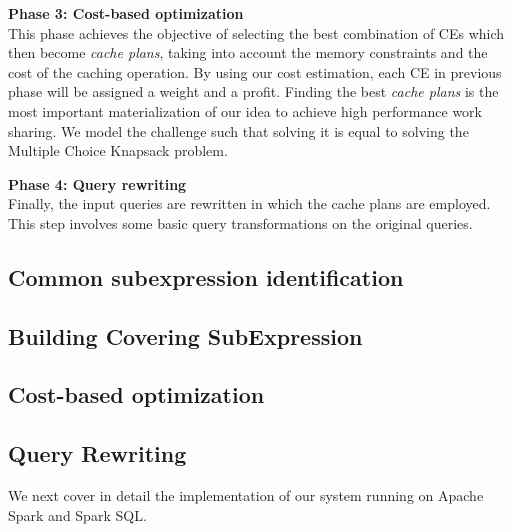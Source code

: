 \textbf{Phase 3: Cost-based optimization}\\
This phase achieves the objective of selecting the best combination of CEs which then become \emph{cache plans}, taking into account the memory constraints and the cost of the caching operation. By using our cost estimation, each CE in previous phase will be assigned a weight and a profit. Finding the best \emph{cache plans} is the most important materialization of our idea to achieve high performance work sharing. We model the challenge such that solving it is equal to solving the Multiple Choice Knapsack problem.

\textbf{Phase 4: Query rewriting}\\
Finally, the input queries are rewritten in which the cache plans are employed. This step involves some basic query transformations on the original queries.

\subsection{Common subexpression identification}
\label{sec:common_sub}


\subsection{Building Covering SubExpression}
\label{sec:covering_subexpression}


\subsection{Cost-based optimization}
\label{sec:cbo}


\subsection{Query Rewriting}
\label{sec:query_rewriting}


We next cover in detail the implementation of our system running on Apache Spark and Spark SQL.